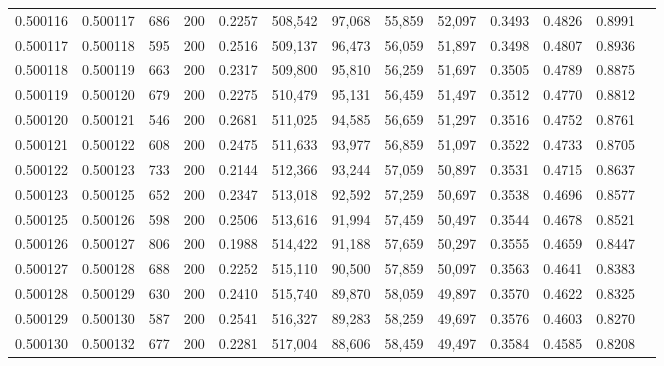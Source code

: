 \begin{tabular}{rrrrrrrrrrrrr}
0.500116 & 0.500117 &    686 & 200 &                                     0.2257 & 508,542 &  97,068 &  55,859 &  52,097 & 0.3493 & 0.4826 & 0.8991 \\
0.500117 & 0.500118 &    595 & 200 &                                     0.2516 & 509,137 &  96,473 &  56,059 &  51,897 & 0.3498 & 0.4807 & 0.8936 \\
0.500118 & 0.500119 &    663 & 200 &                                     0.2317 & 509,800 &  95,810 &  56,259 &  51,697 & 0.3505 & 0.4789 & 0.8875 \\
0.500119 & 0.500120 &    679 & 200 &                                     0.2275 & 510,479 &  95,131 &  56,459 &  51,497 & 0.3512 & 0.4770 & 0.8812 \\
0.500120 & 0.500121 &    546 & 200 &                                     0.2681 & 511,025 &  94,585 &  56,659 &  51,297 & 0.3516 & 0.4752 & 0.8761 \\
0.500121 & 0.500122 &    608 & 200 &                                     0.2475 & 511,633 &  93,977 &  56,859 &  51,097 & 0.3522 & 0.4733 & 0.8705 \\
0.500122 & 0.500123 &    733 & 200 &                                     0.2144 & 512,366 &  93,244 &  57,059 &  50,897 & 0.3531 & 0.4715 & 0.8637 \\
0.500123 & 0.500125 &    652 & 200 &                                     0.2347 & 513,018 &  92,592 &  57,259 &  50,697 & 0.3538 & 0.4696 & 0.8577 \\
0.500125 & 0.500126 &    598 & 200 &                                     0.2506 & 513,616 &  91,994 &  57,459 &  50,497 & 0.3544 & 0.4678 & 0.8521 \\
0.500126 & 0.500127 &    806 & 200 &                                     0.1988 & 514,422 &  91,188 &  57,659 &  50,297 & 0.3555 & 0.4659 & 0.8447 \\
0.500127 & 0.500128 &    688 & 200 &                                     0.2252 & 515,110 &  90,500 &  57,859 &  50,097 & 0.3563 & 0.4641 & 0.8383 \\
0.500128 & 0.500129 &    630 & 200 &                                     0.2410 & 515,740 &  89,870 &  58,059 &  49,897 & 0.3570 & 0.4622 & 0.8325 \\
0.500129 & 0.500130 &    587 & 200 &                                     0.2541 & 516,327 &  89,283 &  58,259 &  49,697 & 0.3576 & 0.4603 & 0.8270 \\
0.500130 & 0.500132 &    677 & 200 &                                     0.2281 & 517,004 &  88,606 &  58,459 &  49,497 & 0.3584 & 0.4585 & 0.8208 \\

\end{tabular}
